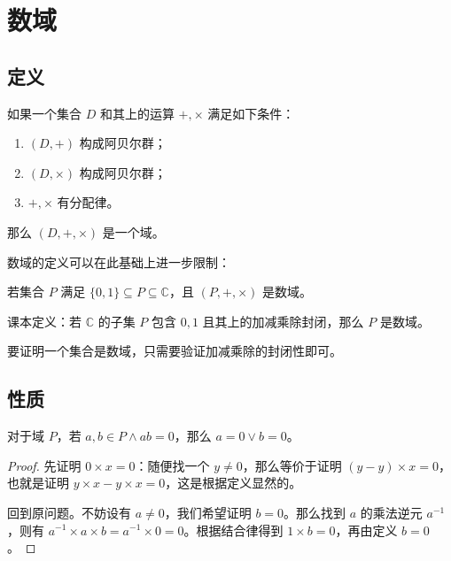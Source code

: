 \section{数域}

\subsection{定义}

\begin{definition}[域的定义]
	如果一个集合 $D$ 和其上的运算 $+,\times$ 满足如下条件：

	\begin{enumerate}
		\item $(D,+)$ 构成阿贝尔群；
		\item $(D,\times)$ 构成阿贝尔群；
		\item $+,\times$ 有分配律。
	\end{enumerate}

	那么 $(D,+,\times)$ 是一个域。
\end{definition}

数域的定义可以在此基础上进一步限制：

\begin{definition}[数域的定义]
	若集合 $P$ 满足 $\{0,1\} \subseteq P \subseteq \mathbb{C}$，且 $(P,+,\times)$ 是数域。

	课本定义：若 $\mathbb{C}$ 的子集 $P$ 包含 $0,1$ 且其上的加减乘除封闭，那么 $P$ 是数域。
\end{definition}

要证明一个集合是数域，只需要验证加减乘除的封闭性即可。

\subsection{性质}

\begin{property}
	对于域 $P$，若 $a,b \in P \land ab=0$，那么 $a=0 \lor b=0$。

	\begin{proof}
		先证明 $0 \times x=0$：随便找一个 $y \neq 0$，那么等价于证明 $(y-y) \times x=0$，也就是证明 $y \times x-y \times x=0$，这是根据定义显然的。

		回到原问题。不妨设有 $a \neq 0$，我们希望证明 $b=0$。那么找到 $a$ 的乘法逆元 $a^{-1}$，则有 $a^{-1} \times a \times b=a^{-1} \times 0=0$。根据结合律得到 $1 \times b=0$，再由定义 $b=0$。
	\end{proof}
\end{property}

